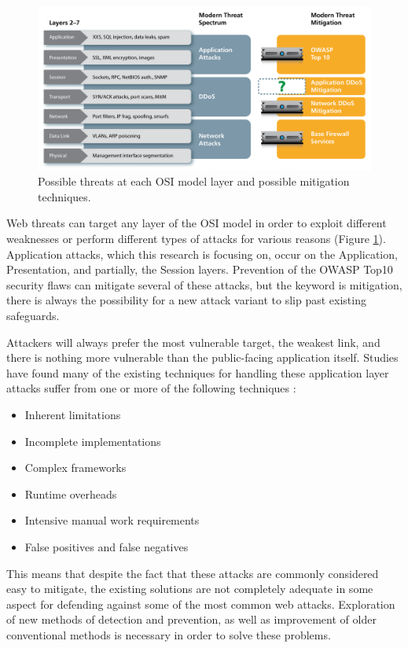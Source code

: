 \begin{figure}
	\includegraphics[width=450px]{./assets/img/osithreats.png}
	\caption{Possible threats at each OSI model layer and possible mitigation techniques. {\cite{f5whitepaper}} }
	\label{fig:osithreats}
\end{figure}

Web threats can target any layer of the OSI model in order to exploit different weaknesses or perform different types of attacks for various reasons (Figure \ref{fig:osithreats}).  Application attacks, which this research is focusing on, occur on the Application, Presentation, and partially, the Session layers.  Prevention of the OWASP Top10 security flaws can mitigate several of these attacks, but the keyword is mitigation, there is always the possibility for a new attack variant to slip past existing safeguards.

Attackers will always prefer the most vulnerable target, the weakest link, and there is nothing more vulnerable than the public-facing application itself.  Studies have found many of the existing techniques for handling these application layer attacks suffer from one or more of the following techniques \cite{aSurveyOnWeb}:

\begin{itemize}
	\item Inherent limitations
	\item Incomplete implementations
	\item Complex frameworks
	\item Runtime overheads
	\item Intensive manual work requirements
	\item False positives and false negatives
\end{itemize}

This means that despite the fact that these attacks are commonly considered easy to mitigate, the existing solutions are not completely adequate in some aspect for defending against some of the most common web attacks.  Exploration of new methods of detection and prevention, as well as improvement of older conventional methods is necessary in order to solve these problems.

